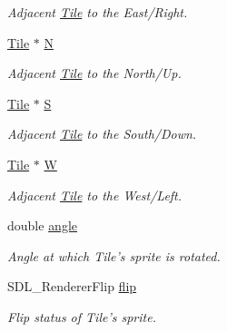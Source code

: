 \begin{DoxyCompactItemize}
\begin{DoxyCompactList}\small\item\em Adjacent \hyperlink{class_tile}{Tile} to the East/\+Right. \end{DoxyCompactList}\item 
\hyperlink{class_tile}{Tile} $\ast$ \hyperlink{class_tile_af1255bd2dba8dfa019fcd65a05805ed1}{N}\hypertarget{class_tile_af1255bd2dba8dfa019fcd65a05805ed1}{}\label{class_tile_af1255bd2dba8dfa019fcd65a05805ed1}

\begin{DoxyCompactList}\small\item\em Adjacent \hyperlink{class_tile}{Tile} to the North/\+Up. \end{DoxyCompactList}\item 
\hyperlink{class_tile}{Tile} $\ast$ \hyperlink{class_tile_adc655f39bc82d9b5898b991faea9df42}{S}\hypertarget{class_tile_adc655f39bc82d9b5898b991faea9df42}{}\label{class_tile_adc655f39bc82d9b5898b991faea9df42}

\begin{DoxyCompactList}\small\item\em Adjacent \hyperlink{class_tile}{Tile} to the South/\+Down. \end{DoxyCompactList}\item 
\hyperlink{class_tile}{Tile} $\ast$ \hyperlink{class_tile_ae992c1605ed059cb9eaff737b99824dc}{W}\hypertarget{class_tile_ae992c1605ed059cb9eaff737b99824dc}{}\label{class_tile_ae992c1605ed059cb9eaff737b99824dc}

\begin{DoxyCompactList}\small\item\em Adjacent \hyperlink{class_tile}{Tile} to the West/\+Left. \end{DoxyCompactList}\item 
double \hyperlink{class_tile_a33219999fbd38d9c9e8e98d09a9b65a5}{angle}\hypertarget{class_tile_a33219999fbd38d9c9e8e98d09a9b65a5}{}\label{class_tile_a33219999fbd38d9c9e8e98d09a9b65a5}

\begin{DoxyCompactList}\small\item\em Angle at which Tile’s sprite is rotated. \end{DoxyCompactList}\item 
S\+D\+L\+\_\+\+Renderer\+Flip \hyperlink{class_tile_a815af374aa83cd0be79bb5553056b15e}{flip}\hypertarget{class_tile_a815af374aa83cd0be79bb5553056b15e}{}\label{class_tile_a815af374aa83cd0be79bb5553056b15e}

\begin{DoxyCompactList}\small\item\em Flip status of Tile’s sprite. \end{DoxyCompactList}\end{DoxyCompactItemize}


